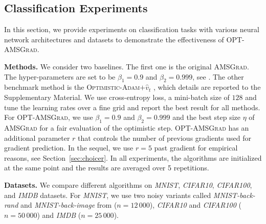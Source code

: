 \documentclass[11pt]{article}
\theoremstyle{k}
\begin{document}
\subsection{Classification Experiments}
In this section, we provide experiments on classification tasks with various neural network architectures and datasets to demonstrate the effectiveness of \textsc{OPT-AMSGrad}.

\textbf{Methods.}
We consider two baselines. The first one is the original \textsc{AMSGrad}. 
The hyper-parameters are set to be $\beta_1 = 0.9$ and $\beta_2 = 0.999$, see \citep{RKK18}. 
The other benchmark method is the \textsc{Optimistic-Adam$+\hat{v}_t$} \citep{DISZ18}, which details are reported to the Supplementary Material. 
We use cross-entropy loss, a mini-batch size of $128$ and tune the learning rates over a fine grid and report the best result for all methods.
For \textsc{OPT-AMSGrad}, we use $\beta_1 = 0.9$ and $\beta_2 = 0.999$ and the best step size $\eta$ of \textsc{AMSGrad} for a fair evaluation of the optimistic step. 
\textsc{OPT-AMSGrad} has an additional parameter $r$ that controls the number of previous gradients used for gradient prediction. 
In the sequel, we use $r=5$ past gradient for empirical reasons, see Section~\ref{sec:choicer}.
In all experiments, the algorithms are initialized at the same point and the results are averaged over 5 repetitions.

\textbf{Datasets.}
We compare different algorithms on \textit{MNIST}, \textit{CIFAR10},
\textit{CIFAR100}, and \textit{IMDB} datasets. 
For \textit{MNIST}, we use two noisy variants called \textit{MNIST-back-rand} and \textit{MNIST-back-image} from \citep{MNIST07} ($n=12\,000$), \textit{CIFAR10} and \textit{CIFAR100} ($n=50\,000$) and \textit{IMDB} ($n=25\,000$). 
\end{document}
